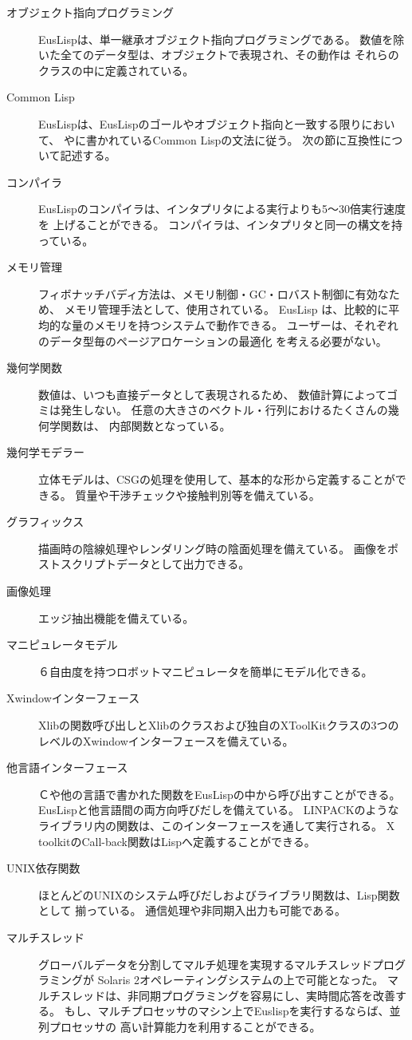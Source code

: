 \begin{description}
\item [オブジェクト指向プログラミング]
EusLispは、単一継承オブジェクト指向プログラミングである。
数値を除いた全てのデータ型は、オブジェクトで表現され、その動作は
それらのクラスの中に定義されている。
\item [Common Lisp] 
EusLispは、EusLispのゴールやオブジェクト指向と一致する限りにおいて、
\cite{CLtL}や\cite{CLtL2}に書かれているCommon Lispの文法に従う。
次の節に互換性について記述する。
\item [コンパイラ]
EusLispのコンパイラは、インタプリタによる実行よりも5〜30倍実行速度を
上げることができる。
コンパイラは、インタプリタと同一の構文を持っている。
\item[メモリ管理] 
フィボナッチバディ方法は、メモリ制御・GC・ロバスト制御に有効なため、
メモリ管理手法として、使用されている。
EusLisp は、比較的に平均的な量のメモリを持つシステムで動作できる。
ユーザーは、それぞれのデータ型毎のページアロケーションの最適化
を考える必要がない。
\item [幾何学関数]
数値は、いつも直接データとして表現されるため、
数値計算によってゴミは発生しない。
任意の大きさのベクトル・行列におけるたくさんの幾何学関数は、
内部関数となっている。
\item [幾何学モデラー]
立体モデルは、CSGの処理を使用して、基本的な形から定義することができる。
質量や干渉チェックや接触判別等を備えている。
\item [グラフィックス]
描画時の陰線処理やレンダリング時の陰面処理を備えている。
画像をポストスクリプトデータとして出力できる。
\item [画像処理]
エッジ抽出機能を備えている。
\item [マニピュレータモデル]
６自由度を持つロボットマニピュレータを簡単にモデル化できる。
\item [Xwindowインターフェース]
Xlibの関数呼び出しとXlibのクラスおよび独自のXToolKitクラスの3つの
レベルのXwindowインターフェースを備えている。
\item [他言語インターフェース]
Ｃや他の言語で書かれた関数をEusLispの中から呼び出すことができる。
EusLispと他言語間の両方向呼びだしを備えている。
LINPACKのようなライブラリ内の関数は、このインターフェースを通して実行される。
X toolkitのCall-back関数はLispへ定義することができる。
\item [UNIX依存関数]
ほとんどのUNIXのシステム呼びだしおよびライブラリ関数は、Lisp関数として
揃っている。
通信処理や非同期入出力も可能である。
\item[マルチスレッド]
グローバルデータを分割してマルチ処理を実現するマルチスレッドプログラミングが
Solaris 2オペレーティングシステムの上で可能となった。
マルチスレッドは、非同期プログラミングを容易にし、実時間応答を改善する\cite{MTEus1,MTEus2}。
もし、マルチプロセッサのマシン上でEuslispを実行するならば、並列プロセッサの
高い計算能力を利用することができる。
\end{description}

